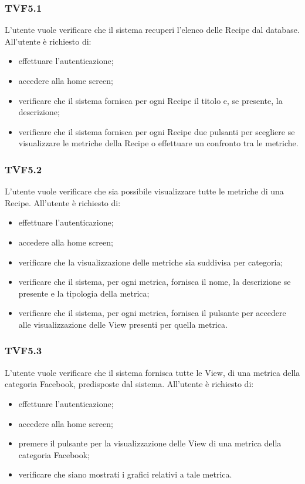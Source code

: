 		\subsubsection{TVF5.1}
			L'utente vuole verificare che il sistema recuperi l'elenco delle Recipe dal database. All'utente è richiesto di:
			\begin{itemize}
				\item effettuare l'autenticazione;
				\item accedere alla home screen;
				\item verificare che il sistema fornisca per ogni Recipe il titolo e, se presente, la descrizione;
				\item verificare che il sistema fornisca per ogni Recipe due pulsanti per scegliere se visualizzare le metriche della Recipe o effettuare un confronto tra le metriche.
			\end{itemize}
			
		\subsubsection{TVF5.2}
			L'utente vuole verificare che sia possibile visualizzare tutte le metriche di una Recipe. All'utente è richiesto di:
			\begin{itemize}
				\item effettuare l'autenticazione;
				\item accedere alla home screen;
				\item verificare che la visualizzazione delle metriche sia suddivisa per categoria;
				\item verificare che il sistema, per ogni metrica, fornisca il nome, la descrizione se presente e la tipologia della metrica;
				\item verificare che il sistema, per ogni metrica, fornisca il pulsante per accedere alle visualizzazione delle View presenti per quella metrica.				
			\end{itemize}
			
		\subsubsection{TVF5.3}
			L'utente vuole verificare che il sistema fornisca tutte le View, di una metrica della categoria Facebook, predisposte dal sistema. All'utente è richiesto di:
			\begin{itemize}
				\item effettuare l'autenticazione;
				\item accedere alla home screen;
				\item premere il pulsante per la visualizzazione delle View di una metrica della categoria Facebook;
				\item verificare che siano mostrati i grafici relativi a tale metrica.
			\end{itemize}
			
